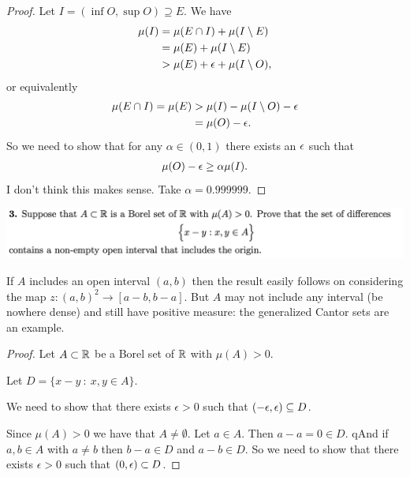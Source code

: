 \begin{proof}
  Let $I = (\inf O, \sup O) \supseteq E$. We have
  \begin{align*}
    \mu(I)
    &= \mu(E \cap I) + \mu(I \setminus E) \\
    &= \mu(E) + \mu(I \setminus E) \\
    &> \mu(E) + \epsilon + \mu(I \setminus O),
  \end{align*}
  or equivalently
  \begin{align*}
    \mu(E \cap I) = \mu(E)
    &> \mu(I) - \mu(I \setminus O) - \epsilon \\
    &= \mu(O) - \epsilon.
  \end{align*}
  So we need to show that for any $\alpha \in (0, 1)$ there exists an $\epsilon$ such that
  \begin{align*}
    \mu(O) - \epsilon \geq \alpha \mu(I).
  \end{align*}
  I don't think this makes sense. Take $\alpha = 0.999999$.
\end{proof}


\newpage
\begin{mdframed}
\includegraphics[width=400pt]{img/analysis--berkeley-202a-hw05-ad8b.png}
\end{mdframed}

\begin{remark*}
  If $A$ includes an open interval $(a, b)$ then the result easily follows on considering the
  map $z:(a, b)^2\to [a-b, b-a]$. But $A$ may not include any interval (be nowhere dense) and still have
  positive measure: the generalized Cantor sets are an example.
\end{remark*}

\begin{proof}
  Let $A \subset \mathbb{R}$ be a Borel set of $\mathbb{R}$ with $\mu(A) > 0$.

  Let $D = \big\{ x - y ~:~ x, y \in A\big\}$.

  We need to show that there exists $\epsilon > 0$ such that $(-\epsilon, \epsilon) \subseteq D$.

  Since $\mu(A) > 0$ we have that $A \neq \emptyset$. Let $a \in A$. Then $a - a = 0 \in D$. qAnd
  if $a, b \in A$ with $a \neq b$ then $b - a \in D$ and $a - b \in D$. So we need to show that there
  exists $\epsilon > 0$ such that $(0, \epsilon) \subset D$.
\end{proof}


















